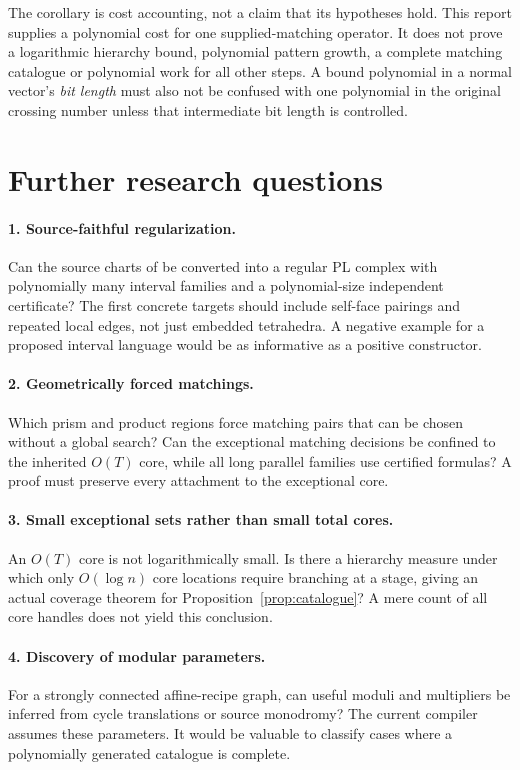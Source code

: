 \documentclass[11pt,letterpaper]{article}
\theoremstyle{definition}
\theoremstyle{remark}\newtheorem{remark}[theorem]{Remark}
\newcommand{\code}[1]{\texttt{\detokenize{#1}}}
\begin{document}
The corollary is cost accounting, not a claim that its hypotheses hold. This report supplies a polynomial cost for one supplied-matching operator. It does not prove a logarithmic hierarchy bound, polynomial pattern growth, a complete matching catalogue or polynomial work for all other steps. A bound polynomial in a normal vector's \emph{bit length} must also not be confused with one polynomial in the original crossing number unless that intermediate bit length is controlled.

\section{Further research questions}
\label{sec:future}

\paragraph{1. Source-faithful regularization.}
Can the source charts of \code{normal-cut-cells-v1} be converted into a regular PL complex with polynomially many interval families and a polynomial-size independent certificate? The first concrete targets should include self-face pairings and repeated local edges, not just embedded tetrahedra. A negative example for a proposed interval language would be as informative as a positive constructor.

\paragraph{2. Geometrically forced matchings.}
Which prism and product regions force matching pairs that can be chosen without a global search? Can the exceptional matching decisions be confined to the inherited $O(T)$ core, while all long parallel families use certified formulas? A proof must preserve every attachment to the exceptional core.

\paragraph{3. Small exceptional sets rather than small total cores.}
An $O(T)$ core is not logarithmically small. Is there a hierarchy measure under which only $O(\log n)$ core locations require branching at a stage, giving an actual coverage theorem for Proposition~\ref{prop:catalogue}? A mere count of all core handles does not yield this conclusion.

\paragraph{4. Discovery of modular parameters.}
For a strongly connected affine-recipe graph, can useful moduli and multipliers be inferred from cycle translations or source monodromy? The current compiler assumes these parameters. It would be valuable to classify cases where a polynomially generated catalogue is complete.
\end{document}
